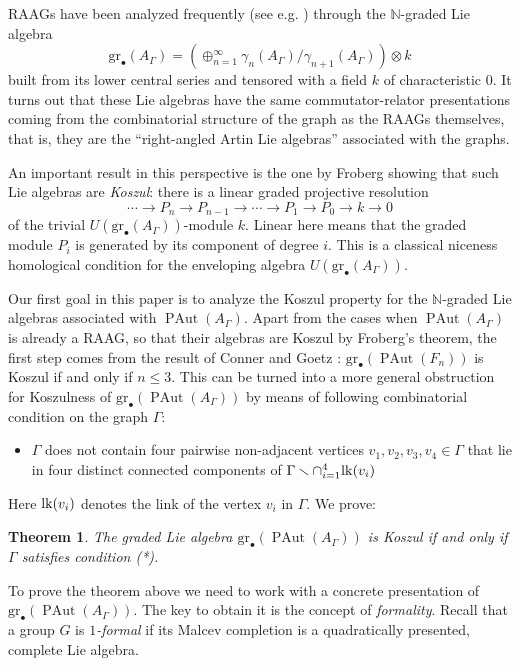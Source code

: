 \documentclass[10pt]{amsart}
\newtheorem{teo}{Theorem}
\theoremstyle{definition}
\newcommand{\lk}{{\rm lk}}
\newcommand{\N}{\mathbb N}
\newcommand{\PAut}{\operatorname{PAut}}
\newcommand{\gr}{\mathrm{gr}_\bullet}
\theoremstyle{definition}
\numberwithin{equation}{section}
\begin{document}
RAAGs have been analyzed frequently (see e.g. \cite{DuchampKrob}) through the $\N$-graded Lie algebra
\[\gr(A_{\Gamma}) = (\oplus_{n=1}^\infty \gamma_n(A_\Gamma)/\gamma_{n+1}(A_\Gamma))\otimes k\]
built from its lower central series and tensored with a field $k$ of characteristic $0$.
It turns out that these Lie algebras have the same commutator-relator presentations coming from the combinatorial structure of the graph as the RAAGs themselves, that is, they are the ``right-angled Artin Lie algebras'' associated with the graphs.

An important result in this perspective is the one by Froberg \cite{Froberg} showing that such Lie algebras are \emph{Koszul}: there is a linear graded projective resolution
\[ \cdots \to P_n \to P_{n-1} \to \cdots \to P_1 \to P_0 \to k \to 0\]
of the trivial $U(\gr(A_{\Gamma}))$-module $k$. Linear here means that the graded module $P_i$ is generated by its component of degree $i$. This is a classical niceness homological condition for the enveloping algebra $U(\gr(A_{\Gamma}))$.

Our first goal in this paper is to analyze the Koszul property for the $\N$-graded Lie algebras associated with $\PAut(A_{\Gamma})$. Apart from the cases when $\PAut(A_{\Gamma})$ is already a RAAG, so that their algebras are Koszul by Froberg's theorem, the first step comes from the result of Conner and Goetz \cite{ConnerGoetz}: $\gr(\PAut(F_n))$ is Koszul if and only if $n \leq 3$. This can be turned into a more general obstruction for Koszulness of $\gr(\PAut(A_{\Gamma}))$ by means of following combinatorial condition on the graph $\Gamma$:


\begin{itemize}
 \item[(*)] $\Gamma$ does not contain four pairwise non-adjacent vertices $v_1, v_2, v_3, v_4 \in \Gamma$ that lie in four distinct connected components of $\Gamma \smallsetminus \cap_{i=1}^4\lk(v_i)$
\end{itemize}

Here $\lk(v_i)$ denotes the link of the vertex $v_i$ in $\Gamma$.  We prove:

\begin{teo} \label{teoA}
The graded Lie algebra $\gr(\PAut(A_{\Gamma}))$ is Koszul if and only if $\Gamma$ satisfies condition (*).
\end{teo}

To prove the theorem above we need to work with a concrete presentation of $\gr(\PAut(A_{\Gamma}))$. The key to obtain it is the concept of \emph{formality}. Recall that a group $G$ is \emph{$1$-formal} if its Malcev completion is a quadratically presented, complete Lie algebra.
\end{document}
